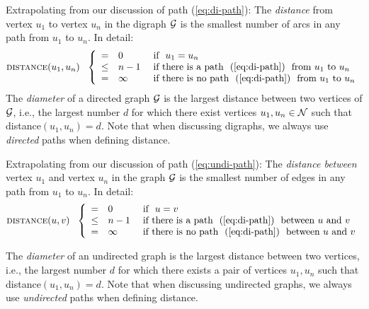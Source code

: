 
Extrapolating from our discussion of path (\ref{eq:di-path}): The {\it distance} from vertex $u_1$ to vertex $u_n$ in the digraph $\mbox{$\cal G$}$ is the smallest number of arcs in any path from $u_1$ to $u_n$.  In detail:
\begin{equation}
\label{eq:di-distance-defn}
 \mbox{\sc distance}(u_1, u_n) \ \ \left\{
\begin{array}{cll}
= & 0 & \mbox{  if  } \ u_1 = u_n \\
\leq & n-1 & \mbox{  if there is a path } \ (\ref{eq:di-path})
\ \mbox{ from $u_1$ to $u_n$} \\
= & \infty & \mbox{  if there is no path } \ (\ref{eq:di-path})
\ \mbox{ from $u_1$ to $u_n$}
\end{array}
\right.
\end{equation}
The {\it diameter} of a directed graph $\mbox{$\cal G$}$ is the largest distance between two vertices of $\mbox{$\cal G$}$, i.e., the largest number $d$ for which there exist vertices $u_1, u_n \in \mbox{$\cal N$}$ such that {\sc distance}$(u_1, u_n) = d$.  Note that when discussing digraphs, we always use {\em directed} paths when defining distance.

  

\medskip


Extrapolating from our discussion of path (\ref{eq:undi-path}): The {\it distance between} vertex $u_1$ and vertex $u_n$ in the graph $\mbox{$\cal G$}$ is the smallest number of edges in any path from $u_1$ to $u_n$.  In detail:
\begin{equation}
\label{eq:distance-defn}
 \mbox{\sc distance}(u, v) \ \ \left\{
\begin{array}{cll}
= & 0 & \mbox{  if  } \ u = v \\
\leq & n-1 & \mbox{  if there is a path } \ (\ref{eq:di-path})
\ \mbox{ between $u$ and $v$} \\
= & \infty & \mbox{  if there is no path } \ (\ref{eq:di-path})
\ \mbox{ between $u$ and $v$}
\end{array}
\right.
\end{equation}

 
The {\it diameter} of an undirected graph is the largest distance between two vertices,  i.e., the largest number $d$ for which there exists a pair of vertices $u_1, u_n$ such that {\sc distance}$(u_1, u_n) = d$.  Note that when discussing undirected graphs, we always use {\em undirected} paths when defining distance.

